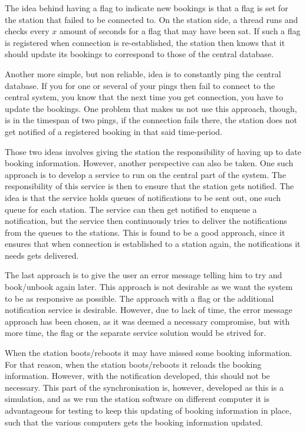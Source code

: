\begin{description}[style=nextline]
	The idea behind having a flag to indicate new bookings is that a flag is set for the station that failed to be connected to.
	On the station side, a thread runs and checks every $x$ amount of seconds for a flag that may have been sat.
	If such a flag is registered when connection is re-established, the station then knows that it should update its bookings to correspond to those of the central database.
	
	Another more simple, but non reliable, idea is to constantly ping the central database.
	If you for one or several of your pings then fail to connect to the central system, you know that the next time you get connection, you have to update the bookings.
	One problem that makes us not use this approach, though, is in the timespan of two pings, if the connection fails there, the station does not get notified of a registered booking in that said time-period.
	
	Those two ideas involves giving the station the responsibility of having up to date booking information.
	However, another perspective can also be taken.
	One such approach is to develop a service to run on the central part of the system.
	The responsibility of this service is then to ensure that the station gets notified.
	The idea is that the service holds queues of notifications to be sent out, one such queue for each station.
	The service can then get notified to enqueue a notification, but the service then continuously tries to deliver the notifications from the queues to the stations. 
	This is found to be a good approach, since it ensures that when connection is established to a station again, the notifications it needs gets delivered.
	
	The last approach is to give the user an error message telling him to try and book/unbook again later.
	This approach is not desirable as we want the system to be as responsive as possible.
	The approach with a flag or the additional notification service is desirable.
	However, due to lack of time, the error message approach has been chosen, as it was deemed a necessary compromise, but with more time, the flag or the separate service solution would be strived for.
	 
	
	\item[Station boot/reboot]
	When the station boots/reboots it may have missed some booking information.
	For that reason, when the station boots/reboots it reloads the booking information.
	However, with the notification developed, this should not be necessary.
	This part of the synchronisation is, however, developed as this is a simulation, and as we run the station software on different computer it is advantageous for testing to keep this updating of booking information in place, such that the various computers gets the booking information updated.
	

\end{description}

